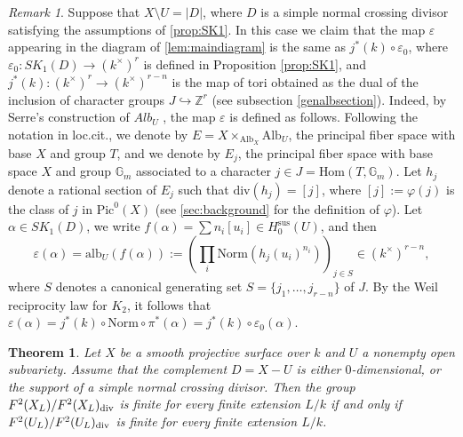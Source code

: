 \documentclass[12pt]{amsart}
\newtheorem{theo}[theo]{Theorem}
\theoremstyle{remark}
\newtheorem{rem}[rem]{Remark}
\renewcommand{\1}{{\mathbb{S}}}
\newcommand{\<}{\langle}
\renewcommand{\>}{\rangle}
\newcommand{\dv}{{\rm div}}
\begin{document}
\begin{rem}\label{rem:epsilonmap} Suppose that $X\setminus U=|D|$, where $D$ is a simple normal crossing divisor satisfying the assumptions of \autoref{prop:SK1}. In this case we claim that
the map $\varepsilon$ appearing in the diagram of  \autoref{lem:maindiagram} is the same as $j^{\ast}(k) \circ \varepsilon_{0}$, where $\varepsilon_{0}: SK_{1}(D) \rightarrow (k^{\times})^r$ is defined in Proposition \ref{prop:SK1}, and $j^{\ast}(k): (k^{\times})^{r} \rightarrow (k^{\times})^{r-n}$ is the map of tori obtained as the dual of  the inclusion of character groups $J \hookrightarrow \mathbb{Z}^{r}$ (see subsection \ref{genalbsection}). Indeed, by Serre's construction of $Alb_{U}$ \cite{Se}, the map $\varepsilon$ is defined as follows. Following the notation in loc.cit., we denote by $E = X \times_{\text{Alb}_{X}} \text{Alb}_{U}$, the principal fiber space with base $X$ and group $T$, and we denote by $E_{j}$, the principal fiber space with base space $X$ and group $\mathbb{G}_{m}$ associated to a character $j \in J = \text{Hom}(T, \mathbb{G}_{m})$. Let $h_{j}$ denote a rational section of $E_{j}$ such that $\text{div}(h_{j}) = [j]$, where $[j]:=\varphi(j)$ is the class of $j$ in $\text{Pic}^0(X)$ (see \autoref{sec:background} for the definition of $\varphi$). Let  $\alpha \in SK_{1}(D)$, we write $f(\alpha) = \sum n_{i}[u_{i}] \in H^{\text{sus}}_{0}(U)$, and then
\[
\varepsilon(\alpha) = \text{alb}_{U}(f(\alpha)) := \left( \prod_{i} \text{Norm} (h_{j}(u_{i})^{n_{i}}) \right)_{j \in S} \in (k^{\times})^{r-n},
\]
where $S$ denotes a canonical generating set $S=\{j_1,\ldots, j_{r-n}\}$ of $J$. By the Weil reciprocity law for $K_{2}$, it follows that $\varepsilon (\alpha) = j^{\ast}(k) \circ \text{Norm} \circ \pi^{\ast} (\alpha) = j^{\ast}(k) \circ \varepsilon_{0} (\alpha)$.
\end{rem}





\begin{theo}\label{thm:main2} Let $X$ be a smooth projective surface over $k$ and $U$ a nonempty open subvariety. Assume that the complement $D=X-U$ is either $0$-dimensional, or the support of a simple normal crossing divisor. Then the group $F^2(X_L)/F^2(X_L)_{\dv}$ is finite for every finite extension $L/k$ if and only if $F^2(U_{L})/F^2(U_{L})_{\dv}$ is finite for every finite extension $L/k$. 
 \end{theo}
 
\end{document}
